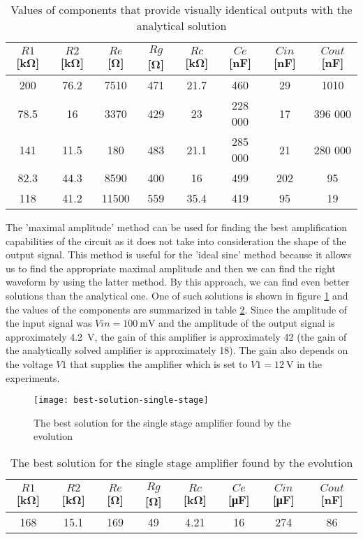 \begin{table}[H]
\centering
\begin{tabular}{@{}c ccccccc@{}}
\toprule
    $R1$ [\si{\kilo\ohm}] & $R2$ [\si{\kilo\ohm}] & $Re$ [\si{\ohm}] & $Rg$ [\si{\ohm}] & $Rc$ [\si{\kilo\ohm}] & $Ce$ [\si{\nano\farad}] & $Cin$ [\si{\nano\farad}] & $Cout$ [\si{\nano\farad}] \\
    \midrule
    200   & 76.2 & 7510  & 471 & 21.7 & 460     & 29    & 1010 \\
    78.5  & 16   & 3370  & 429 & 23   & 228 000 & 17    & 396 000 \\
    141   & 11.5 & 180   & 483 & 21.1 & 285 000 & 21    & 280 000 \\
    82.3  & 44.3 & 8590  & 400 & 16   & 499     & 202   & 95 \\
    118   & 41.2 & 11500 & 559 & 35.4 & 419     & 95    & 19 \\
    \bottomrule
\end{tabular}
\caption{Values of components that provide visually identical outputs with the analytical solution}
\label{best-fit-solutions}
\end{table}

The 'maximal amplitude' method can be used for finding the best amplification capabilities of the circuit as it does not take into consideration the shape of the output signal. This method is useful for the 'ideal sine' method because it allows us to find the appropriate maximal amplitude and then we can find the right waveform by using the latter method. By this approach, we can find even better solutions than the analytical one. One of such solutions is shown in figure \ref{better-solution-fig} and the values of the components are summarized in table \ref{better-solution-tab}. Since the amplitude of the input signal was $Vin = \SI{100}{\milli\volt}$ and the amplitude of the output signal is approximately \SI{4.2}{\volt}, the gain of this amplifier is approximately 42 (the gain of the analytically solved amplifier is approximately 18). The gain also depends on the voltage $V1$ that supplies the amplifier which is set to $V1 = \SI{12}{\volt}$ in the experiments.

\begin{figure}[!htb]
    \centerline{\texttt{[image: best-solution-single-stage]}\label{better-solution-fig}}
    \caption{The best solution for the single stage amplifier found by the evolution}
\end{figure}

\begin{table}[H]
\centering
\begin{tabular}{@{}cccccccc@{}}
\toprule
    $R1$ [\si{\kilo\ohm}] & $R2$ [\si{\kilo\ohm}] & $Re$ [\si{\ohm}] & $Rg$ [\si{\ohm}] & $Rc$ [\si{\kilo\ohm}] & $Ce$ [\si{\micro\farad}] & $Cin$ [\si{\micro\farad}] & $Cout$ [\si{\nano\farad}] \\
    \midrule
    168 & 15.1 & 169 & 49 & 4.21 & 16 & 274 & 86 \\
    \bottomrule
\end{tabular}
\caption{The best solution for the single stage amplifier found by the evolution}
\label{better-solution-tab}
\end{table}


